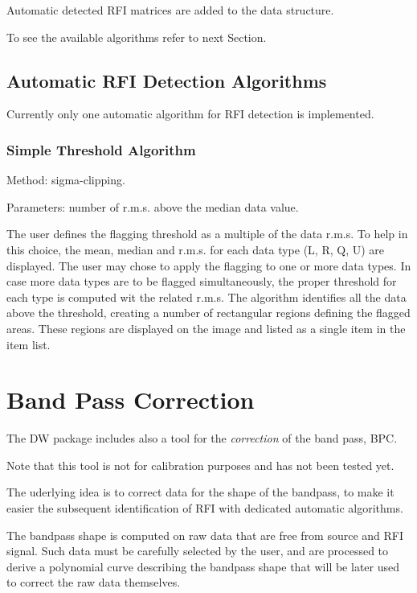 \documentclass[letterpaper,10pt,english]{sphinxmanual}
\begin{document}
Automatic detected RFI matrices are added to the data structure.

To see the available algorithms refer to next Section.


\section{Automatic RFI Detection Algorithms}
\label{flagging:automatic-rfi-detection-algorithms}
Currently only one automatic algorithm for RFI detection is implemented.


\subsection{Simple Threshold Algorithm}
\label{flagging:simple-threshold-algorithm}
Method: sigma-clipping.

Parameters: number of r.m.s. above the median data value.

The user defines the flagging threshold as a multiple of the data r.m.s. To help
in this choice, the mean, median and r.m.s. for each data type (L, R, Q, U) are displayed.
The user may chose to apply the flagging to one or more data types. In case more data
types are to be flagged simultaneously, the proper threshold for each type is computed
wit the related r.m.s.
The algorithm identifies all the data above the threshold, creating a number of rectangular
regions defining the flagged areas. These regions are displayed on the image and listed as
a single item in the item list.


\chapter{Band Pass Correction}
\label{bpc:band-pass-correction}\label{bpc::doc}
The DW package includes also a tool for the \emph{correction} of the band pass, BPC.

Note that this tool is not for calibration purposes and
has not been tested yet.

The uderlying idea is to correct data for the shape of the bandpass, to make
it easier the subsequent identification of RFI with dedicated automatic
algorithms.

The bandpass shape is computed on raw data that are free from source and RFI
signal. Such data must be carefully selected by the user, and are processed to
derive a polynomial curve describing the bandpass shape that will be later
used to correct the raw data themselves.
\end{document}
